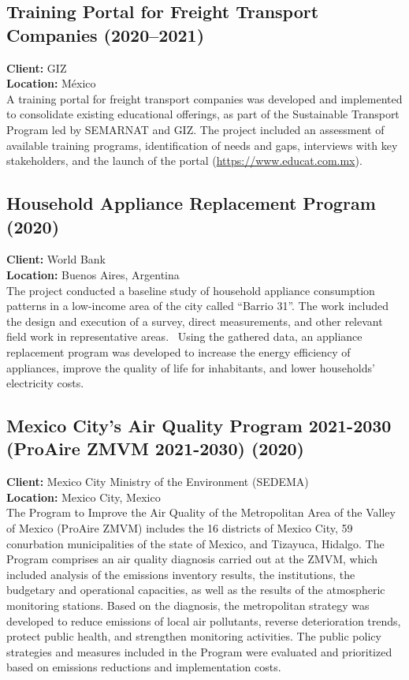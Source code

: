 \documentclass[
	a4paper,
	12pt,
	unnumberedsections,
]{CSSullivanBusinessReport}
\begin{document}
\subsection{Training Portal for Freight Transport Companies (2020–2021)}
\textbf{Client:}  GIZ \\
\textbf{Location:}  México \\[0.5em]
 A training portal for freight transport companies was developed and implemented to consolidate existing educational offerings, as part of the Sustainable Transport Program led by SEMARNAT and GIZ. The project included an assessment of available training programs, identification of needs and gaps, interviews with key stakeholders, and the launch of the portal (\url{https://www.educat.com.mx}).

\subsection{Household Appliance Replacement Program (2020)}
\textbf{Client:}  World Bank \\
\textbf{Location:}  Buenos Aires, Argentina \\[0.5em]
 The project conducted a baseline study of household appliance consumption patterns in a low-income area of the city called “Barrio 31”. The work included the design and execution of a survey, direct measurements, and other relevant field work in representative areas.  Using the gathered data, an appliance replacement program was developed to increase the energy efficiency of appliances, improve the quality of life for inhabitants, and lower households' electricity costs.

\subsection{Mexico City’s Air Quality Program 2021-2030 (ProAire ZMVM 2021-2030) (2020)}
\textbf{Client:}  Mexico City Ministry of the Environment (SEDEMA) \\
\textbf{Location:}  Mexico City, Mexico \\[0.5em]
 The Program to Improve the Air Quality of the Metropolitan Area of the Valley of Mexico (ProAire ZMVM) includes the 16 districts of Mexico City, 59 conurbation municipalities of the state of Mexico, and Tizayuca, Hidalgo. The Program comprises an air quality diagnosis carried out at the ZMVM, which included analysis of the emissions inventory results, the institutions, the budgetary and operational capacities, as well as the results of the atmospheric monitoring stations. Based on the diagnosis, the metropolitan strategy was developed to reduce emissions of local air pollutants, reverse deterioration trends, protect public health, and strengthen monitoring activities. The public policy strategies and measures included in the Program were evaluated and prioritized based on emissions reductions and implementation costs.
\end{document}
